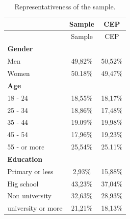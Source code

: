\documentclass[
]{article}
\begin{document}
\begin{longtable}[]{@{}lcc@{}}
\caption{Representativeness of the sample.}\tabularnewline
\toprule
& Sample & CEP\tabularnewline
\midrule
\endfirsthead
\toprule
& Sample & CEP\tabularnewline
\midrule
\endhead
\textbf{Gender} & &\tabularnewline
Men & 49,82\% & 50,52\%\tabularnewline
Women & 50.18\% & 49,47\%\tabularnewline
\textbf{Age} & &\tabularnewline
18 - 24 & 18,55\% & 18,17\%\tabularnewline
25 - 34 & 18,86\% & 17,48\%\tabularnewline
35 - 44 & 19.09\% & 19,98\%\tabularnewline
45 - 54 & 17,96\% & 19,23\%\tabularnewline
55 - or more & 25,54\% & 25.11\%\tabularnewline
\textbf{Education} & &\tabularnewline
Primary or less & 2,93\% & 15,88\%\tabularnewline
Hig school & 43,23\% & 37,04\%\tabularnewline
Non university & 32,63\% & 28,93\%\tabularnewline
university or more & 21,21\% & 18,13\%\tabularnewline
\bottomrule
\end{longtable}
\end{document}
